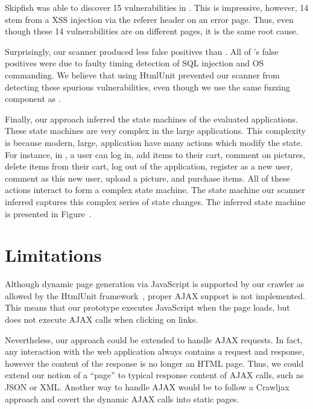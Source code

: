 Skipfish was able to discover 15 vulnerabilities in \vanillaforums{}. This is
impressive, however, 14 stem from a XSS injection via the referer header on an
error page. Thus, even though these 14 vulnerabilities are on different pages,
it is the same root cause. 

Surprisingly, our scanner produced less false positives than \waf{}. All of
\waf{}'s false positives were due to faulty timing detection of SQL injection
and OS commanding. We believe that using HtmlUnit prevented our scanner from
detecting these spurious vulnerabilities, even though we use the same fuzzing
component as \waf{}.

Finally, our approach inferred the state machines of the evaluated
applications. These state machines are very complex in the large applications.
This complexity is because modern, large, application have many actions which modify the
state. For instance, in \wackopicko{}, a user can log in, add items to their
cart, comment on pictures, delete items from their cart, log out of the
application, register as a new user, comment as this new user, upload a
picture, and purchase items. All of these actions interact to form a complex
state machine. The state machine our scanner inferred captures this complex
series of state changes. The inferred \wackopicko{} state machine is presented
in Figure~.



\section{Limitations}

Although dynamic page generation via JavaScript is supported by our crawler as allowed by the HtmlUnit
framework~\cite{htmlunit}, proper AJAX support is not implemented. This means that our prototype
executes JavaScript when the page loads, but does not execute AJAX calls when
clicking on links.

Nevertheless, our approach could be extended to handle AJAX requests. In fact,
any interaction with the web application always contains a request and
response, however the content of the response is no longer an HTML page. Thus,
we could extend our notion of a ``page'' to typical response content of AJAX
calls, such as JSON or XML. Another way to handle AJAX would be to follow a
Crawljax~\cite{mesbah09:crawljax} approach and covert the dynamic AJAX calls
into static pages.

